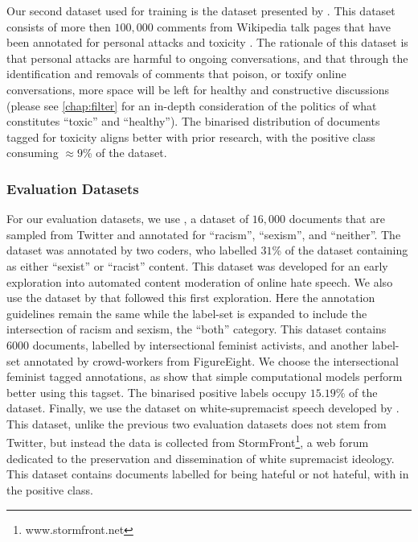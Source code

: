 Our second dataset used for training is the dataset presented by \citet{Wulczyn:2017}. This dataset consists of more then $100,000$ comments from Wikipedia talk pages that have been annotated for personal attacks and toxicity \cite{Wulczyn:2017}. The rationale of this dataset is that personal attacks are harmful to ongoing conversations, and that through the identification and removals of comments that poison, or toxify online conversations, more space will be left for healthy and constructive discussions (please see \autoref{chap:filter} for an in-depth consideration of the politics of what constitutes ``toxic'' and ``healthy''). The binarised distribution of documents tagged for toxicity aligns better with prior research, with the positive class consuming $\approx 9$\% of the dataset.

\subsubsection{Evaluation Datasets}
For our evaluation datasets, we use \citet{Waseem-Hovy:2016}, a dataset of $16,000$ documents that are sampled from Twitter and annotated for ``racism'', ``sexism'', and ``neither''. The dataset was annotated by two coders, who labelled $31$\% of the dataset containing as either ``sexist'' or ``racist'' content. This dataset was developed for an early exploration into automated content moderation of online hate speech. We also use the dataset by \citet{Waseem:2016} that followed this first exploration. Here the annotation guidelines remain the same while the label-set is expanded to include the intersection of racism and sexism, the ``both'' category. This dataset contains $6000$ documents, labelled by intersectional feminist activists, and another label-set annotated by crowd-workers from FigureEight. We choose the intersectional feminist tagged annotations, as \citet{Waseem:2016} show that simple computational models perform better using this tagset. The binarised positive labels occupy $15.19$\% of the dataset. Finally, we use the dataset on white-supremacist speech developed by \citet{Garcia:2019}. This dataset, unlike the previous two evaluation datasets does not stem from Twitter, but instead the data is collected from StormFront\footnote{www.stormfront.net}, a web forum dedicated to the preservation and dissemination of white supremacist ideology. This dataset contains  documents labelled for being hateful or not hateful, with  in the positive class.

